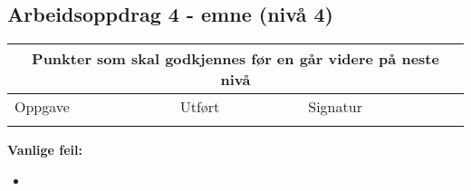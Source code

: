 \subsection*{Arbeidsoppdrag 4 - emne (nivå 4)}
\begin{center}
\begin{tabular}{ | m{8cm} | m{1cm}| m{2cm} | } 
\hline
\multicolumn{3}{|c|}{Punkter som skal godkjennes før en går videre på neste nivå} \\
	\hline
	Oppgave	& Utført & Signatur \\ 
	\hline
& & \\ 
	\hline
\end{tabular}
\end{center}
\textbf{Vanlige feil:}
\begin{itemize}[noitemsep]
	\item 
\end{itemize}
\newpage




